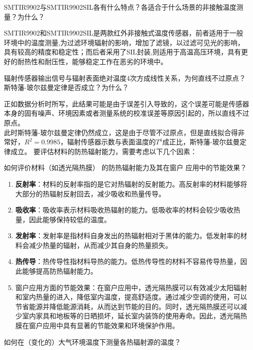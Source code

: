 \documentclass[dvipsnames, svgnames,a4paper,11pt]{article}
\begin{document}
	\begin{question}
	SMTIR9902与SMTIR9902SIL各有什么特点？各适合于什么场景的非接触温度测量？为什么？
	\end{question}
	SMTIR9902和SMTIR9902SIL是两款红外非接触式温度传感器，前者适用于一般环境中的温度测量,为过滤环境辐射的影响，增加了滤镜，以过滤可见光的影响，具有较高的精度和稳定性；而后者采用了SIL封装,则适用于高温高压环境，具有更好的耐热性和耐压性，能够稳定工作在恶劣的环境中。
	\begin{question}
	辐射传感器输出信号与辐射表面绝对温度4次方成线性关系，为何直线不过原点？斯特藩-玻尔兹曼定律是否成立？为什么？
	\end{question}
	正如数据分析时所写，此结果可能是由于误差引入导致的，这个误差可能是传感器本身的固有噪声、环境因素或者测量系统的校准误差等原因引起的，所以直线不过原点。\\
	此时斯特藩-玻尔兹曼定律仍然成立，这是由于尽管不过原点，但是直线拟合得非常好，$R^{2}=0.9985$，辐射传感器示数与表面温度的$T^4$成正比，斯特藩-玻尔兹曼定律成立。
	要评估材料的防热辐射能力，需要考虑以下几个因素：
	\begin{question}
		如何评价材料（如透光隔热膜） 的防热辐射能力及其在窗户
应用中的节能效果？
		\end{question}
\begin{enumerate}
  \item \textbf{反射率}：材料的反射率指的是它对热辐射的反射能力。高反射率的材料能够将大部分的热辐射反射回去，减少吸收和热量传导。

  \item \textbf{吸收率}：吸收率表示材料吸收热辐射的能力。低吸收率的材料会较少吸收热量，因此能够保持较低的温度。

  \item \textbf{发射率}：发射率是指材料自身发出的热辐射相对于黑体的能力。低发射率的材料会减少热量的辐射，从而减少其自身的热量损失。

  \item \textbf{热传导}：热传导性指材料导热的能力。低热传导性的材料不容易传导热量，因此能够提高防热辐射能力。
  \item 窗户应用方面的节能效果：在窗户应用中，透光隔热膜可以有效减少太阳辐射和室内热量的进入，降低室内温度，提高舒适度。通过减少空调的使用，可以节省能源并降低能源消耗，从而达到节能的目的。同时，透光隔热膜还可以减少室内家具和地板等的日晒损坏，延长室内装饰的使用寿命。因此，透光隔热膜在窗户应用中具有显著的节能效果和环境保护作用。


\end{enumerate}
\begin{question}
	如何在（变化的）大气环境温度下测量各热辐射源的温度？
	\end{question}
\end{document}
